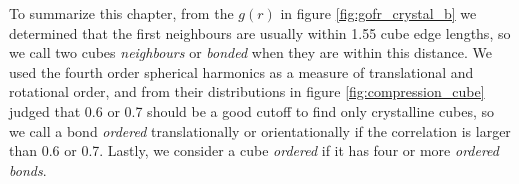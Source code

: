 \documentclass[thesis]{subfiles}
\begin{document}
To summarize this chapter, from the $g(r)$ in figure \ref{fig:gofr_crystal_b} we determined that the first neighbours are usually within 1.55 cube edge lengths, so we call two cubes \emph{neighbours} or \emph{bonded} when they are within this distance. We used the fourth order spherical harmonics as a measure of translational and rotational order, and from their distributions in figure \ref{fig:compression_cube} judged that 0.6 or 0.7 should be a good cutoff to find only crystalline cubes, so we call a bond \emph{ordered} translationally or orientationally if the correlation is larger than 0.6 or 0.7. Lastly, we consider a cube \emph{ordered} if it has four or more \emph{ordered bonds}. 

\end{document}
